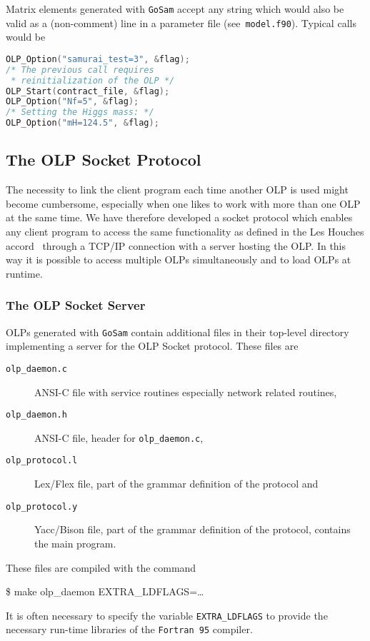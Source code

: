 \documentclass[11pt,a4paper]{refrep}
\newcommand{\golemversion}{{1{.}0}}
\newcommand{\golemv}[1][\golemversion]{{\tt GoSam}\xspace}
\newcommand{\fortranXC}{{\tt Fortran\,95}\xspace}
\begin{document}
Matrix elements generated with \golemv{} accept any string which would
also be valid as a (non-comment) line in a parameter
file (see~\texttt{model.f90}). Typical calls would be
\begin{lstlisting}[language=C]
OLP_Option("samurai_test=3", &flag);
/* The previous call requires 
 * reinitialization of the OLP */
OLP_Start(contract_file, &flag);
OLP_Option("Nf=5", &flag);
/* Setting the Higgs mass: */
OLP_Option("mH=124.5", &flag);
\end{lstlisting}

\subsection{The OLP Socket Protocol}
The necessity to link the client program each time another OLP is used
might become cumbersome, especially when one likes to work with more than
one OLP at the same time. We have therefore developed a socket protocol
which enables any client program to access the same functionality as
defined in the Les Houches accord~\cite{Binoth:2010xt} through a TCP/IP
connection with a server hosting the OLP. In this way it is possible
to access multiple OLPs simultaneously and to load OLPs at runtime.

\subsubsection{The OLP Socket Server}
OLPs generated with \golemv{} contain additional files in their
top-level directory implementing a server for the OLP Socket protocol.
These files are
\begin{description}
\item[\texttt{olp\_daemon.c}] ANSI-C file with service routines especially
    network related routines,
\item[\texttt{olp\_daemon.h}] ANSI-C file, header for \texttt{olp\_daemon.c},
\item[\texttt{olp\_protocol.l}] Lex/Flex file, part of the grammar definition
    of the protocol and
\item[\texttt{olp\_protocol.y}] Yacc/Bison file, part of the grammar
    definition of the protocol, contains the main program.
\end{description}
These files are compiled with the command
\begin{example}
\$ make olp\_daemon EXTRA\_LDFLAGS=\dots
\end{example}
It is often necessary to specify the variable \verb!EXTRA_LDFLAGS!
to provide the necessary run-time libraries of the \fortranXC{} compiler.
\end{document}
